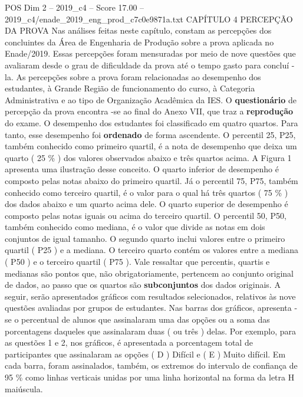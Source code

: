 \begin{textsample}{POS Dim 2 – 2019\_c4 – Score 17.00 – 2019\_c4/enade\_2019\_eng\_prod\_c7c0e9871a.txt}  \label{ex:f2_pos_050}
CAPÍTULO 4 PERCEPÇÃO DA PROVA Nas análises feitas neste capítulo, constam as percepções dos concluintes da Área de Engenharia de Produção sobre a prova aplicada no Enade/2019.
Essas percepções foram mensuradas por meio de nove questões que avaliaram desde o grau de dificuldade da prova até o tempo gasto para concluí -la.
As percepções sobre a prova foram relacionadas ao desempenho dos estudantes, à Grande Região de funcionamento do curso, à Categoria Administrativa e ao tipo de Organização Acadêmica da IES.
O \textbf{questionário} de percepção da prova encontra -se ao final do Anexo VII, que traz a \textbf{reprodução} do exame.
O desempenho dos estudantes foi classificado em quatro quartos.
Para tanto, esse desempenho foi \textbf{ordenado} de forma ascendente.
O percentil 25, P25, também conhecido como primeiro quartil, é a nota de desempenho que deixa um quarto ( 25 \% ) dos valores observados abaixo e três quartos acima.
A Figura 1 apresenta uma ilustração desse conceito.
O quarto inferior de desempenho é composto pelas notas abaixo do primeiro quartil.
Já o percentil 75, P75, também conhecido como terceiro quartil, é o valor para o qual há três quartos ( 75 \% ) dos dados abaixo e um quarto acima dele.
O quarto superior de desempenho é composto pelas notas iguais ou acima do terceiro quartil.
O percentil 50, P50, também conhecido como mediana, é o valor que divide as notas em dois conjuntos de igual tamanho.
O segundo quarto inclui valores entre o primeiro quartil ( P25 ) e a mediana.
O terceiro quarto contém os valores entre a mediana ( P50 ) e o terceiro quartil ( P75 ).
Vale ressaltar que percentis, quartis e medianas são pontos que, não obrigatoriamente, pertencem ao conjunto original de dados, ao passo que os quartos são \textbf{subconjuntos} dos dados originais.
A seguir, serão apresentados gráficos com resultados selecionados, relativos às nove questões avaliadas por grupos de estudantes.
Nas barras dos gráficos, apresenta -se o percentual de alunos que assinalaram uma das opções ou a soma das porcentagens daqueles que assinalaram duas ( ou três ) delas.
Por exemplo, para as questões 1 e 2, nos gráficos, é apresentada a porcentagem total de participantes que assinalaram as opções ( D ) Difícil e ( E ) Muito difícil.
Em cada barra, foram assinalados, também, os extremos do intervalo de confiança de 95 \% como linhas verticais unidas por uma linha horizontal na forma da letra H maiúscula.

\end{textsample}
